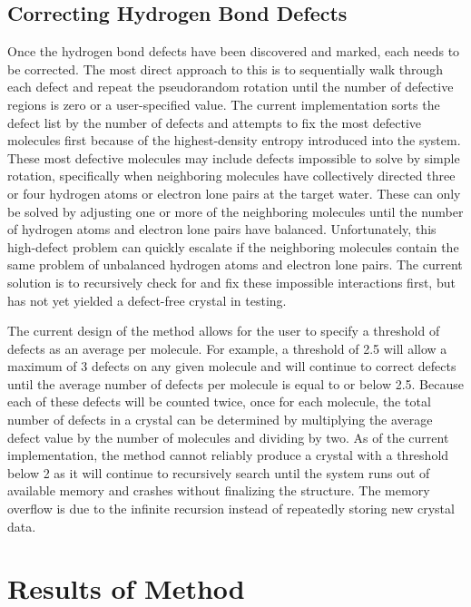 \subsection{Correcting Hydrogen Bond Defects}

Once the hydrogen bond defects have been discovered and marked, each needs to be corrected.
The most direct approach to this is to sequentially walk through each defect and repeat the pseudorandom rotation until the number of defective regions is zero or a user-specified value.
The current implementation sorts the defect list by the number of defects and attempts to fix the most defective molecules first because of the highest-density entropy introduced into the system.
These most defective molecules may include defects impossible to solve by simple rotation, specifically when neighboring molecules have collectively directed three or four hydrogen atoms or electron lone pairs at the target water. 
These can only be solved by adjusting one or more of the neighboring molecules until the number of hydrogen atoms and electron lone pairs have balanced.
Unfortunately, this high-defect problem can quickly escalate if the neighboring molecules contain the same problem of unbalanced hydrogen atoms and electron lone pairs. 
The current solution is to recursively check for and fix these impossible interactions first, but has not yet yielded a defect-free crystal in testing.

The current design of the method allows for the user to specify a threshold of defects as an average per molecule. 
For example, a threshold of 2.5 will allow a maximum of 3 defects on any given molecule and will continue to correct defects until the average number of defects per molecule is equal to or below 2.5.
Because each of these defects will be counted twice, once for each molecule, the total number of defects in a crystal can be determined by multiplying the average defect value by the number of molecules and dividing by two.
As of the current implementation, the method cannot reliably produce a crystal with a threshold below 2 as it will continue to recursively search until the system runs out of available memory and crashes without finalizing the structure.
The memory overflow is due to the infinite recursion instead of repeatedly storing new crystal data.

\section{Results of Method}

